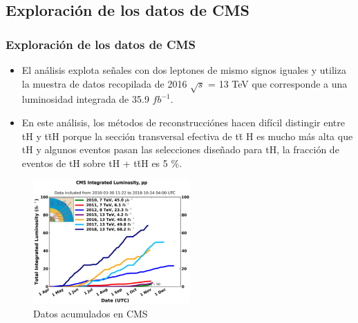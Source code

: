\documentclass[11pt]{beamer}
\begin{document}
\begin{frame}
\section{Exploraci\'on de los datos de CMS}
\frametitle{Exploraci\'on de los datos de CMS}
\footnotesize{
\begin{itemize}
\item El análisis explota se\~nales con dos leptones de mismo signos iguales y utiliza la muestra de datos recopilada de 2016 $ \sqrt{s} $ = 13 TeV que corresponde a una luminosidad integrada de 35.9 $ fb^{-1} $.
\item En este análisis, los métodos de reconstrucciónes hacen dif\'icil distingir  entre tH y t\={t}H porque
la sección transversal efectiva de t\={t} H es mucho más alta que tH y algunos eventos pasan las selecciones
diseñado para tH, la fracción de eventos de tH sobre tH + t\={t}H es 5 $\%$.

\end{itemize}
}
\end{frame}

\begin{frame}
\begin{center}
\begin{figure}
\includegraphics[width=6cm]{cms_lumi.png}
\caption{Datos acumulados en CMS}
\end{figure}
\end{center}
\end{frame}
\end{document}
